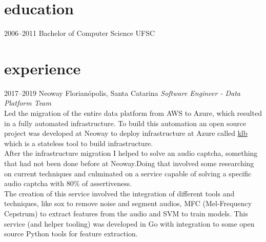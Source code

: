 \documentclass[]{friggeri-cv} %
\begin{document}
\section{education}

\begin{entrylist}
\entry
{2006--2011}
{Bachelor of Computer Science}
{UFSC}
{}
\end{entrylist}


\section{experience}

\begin{entrylist}
\entry
{2017--2019}
{Neoway}
{Florianópolis, Santa Catarina}
{\emph{Software Engineer - Data Platform Team} \\

Led the migration of the entire data platform from AWS to Azure,
which resulted in a fully automated infrastructure.
To build this automation an open source project was developed
at Neoway to deploy infrastructure at Azure called
{\href{https://github.com/NeowayLabs/klb}{klb}} which is
a stateless tool to build infrastructure.\\

After the infrastructure migration I helped to solve an
audio captcha, something that had not
been done before at Neoway.Doing that involved some researching
on current techniques and culminated on a service capable
of solving a specific audio captcha with 80\% of assertiveness.\\

The creation of this service involved the integration of different
tools and techniques, like sox to remove noise and segment audios,
MFC (Mel-Frequency Cepstrum) to extract features from the audio
and SVM to train models. This service (and helper tooling) was developed in Go
with integration to some open source Python tools for feature extraction.\\
}
\end{entrylist}
\end{document}
